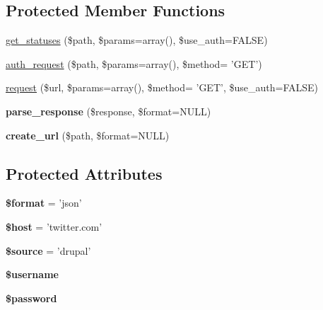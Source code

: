 \subsection*{Protected Member Functions}
\begin{CompactItemize}
\item 
\hyperlink{classTwitter_37f6425df087eb6bf1477fd0921c8d28}{get\_\-statuses} (\$path, \$params=array(), \$use\_\-auth=FALSE)
\item 
\hyperlink{classTwitter_be4761ddb2a687520077da1748675edd}{auth\_\-request} (\$path, \$params=array(), \$method= 'GET')
\item 
\hyperlink{classTwitter_066d888ba8cac684149f69174029d6f5}{request} (\$url, \$params=array(), \$method= 'GET', \$use\_\-auth=FALSE)
\item 
\hypertarget{classTwitter_e7ad23b5dbdb418c3b3460d43cdf5ead}{
\textbf{parse\_\-response} (\$response, \$format=NULL)}
\label{classTwitter_e7ad23b5dbdb418c3b3460d43cdf5ead}

\item 
\hypertarget{classTwitter_226ef437c514d7d7b040968f159413ec}{
\textbf{create\_\-url} (\$path, \$format=NULL)}
\label{classTwitter_226ef437c514d7d7b040968f159413ec}

\end{CompactItemize}
\subsection*{Protected Attributes}
\begin{CompactItemize}
\item 
\hypertarget{classTwitter_823fbab56095681f25eb6e7d9dd7914e}{
\textbf{\$format} = 'json'}
\label{classTwitter_823fbab56095681f25eb6e7d9dd7914e}

\item 
\hypertarget{classTwitter_1e24d0bbd52dc164c4cf7c1ad0824d28}{
\textbf{\$host} = 'twitter.com'}
\label{classTwitter_1e24d0bbd52dc164c4cf7c1ad0824d28}

\item 
\hypertarget{classTwitter_7dabf043dee7e16d7576973cd841b039}{
\textbf{\$source} = 'drupal'}
\label{classTwitter_7dabf043dee7e16d7576973cd841b039}

\item 
\hypertarget{classTwitter_7b376410499064788b8f8257cdc3f774}{
\textbf{\$username}}
\label{classTwitter_7b376410499064788b8f8257cdc3f774}

\item 
\hypertarget{classTwitter_f20e53da27e07651602a3a3b5e03bf90}{
\textbf{\$password}}
\label{classTwitter_f20e53da27e07651602a3a3b5e03bf90}

\end{CompactItemize}


